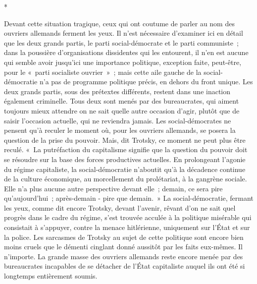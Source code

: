 \documentclass[french,twoside]{book} %
\begin{document}
\begin{center}
*\end{center}
\noindent Devant cette situation tragique, ceux qui ont coutume de parler au nom des ouvriers allemands ferment les yeux. Il n'est nécessaire d'examiner ici en détail que les deux grands partis, le parti social-démocrate et le parti commu­niste ; dans la poussière d'organisations dissidentes qui les entourent, il n'en est aucune qui semble avoir jusqu'ici une importance politique, exception faite, peut-être, pour le « parti socialiste ouvrier » ; mais cette aile gauche de la social-démocratie n'a pas de programme politique précis, en dehors du front unique. Les deux grands partis, sous des prétextes différents, restent dans une inaction également criminelle. Tous deux sont menés par des bureaucrates, qui aiment toujours mieux attendre on ne sait quelle autre occasion d'agir, plutôt que de saisir l'occasion actuelle, qui ne reviendra jamais. Les social-démo­crates ne pensent qu'à reculer le moment où, pour les ouvriers allemands, se posera la question de la prise du pouvoir. Mais, dit Trotsky, ce moment ne peut plus être reculé. « La putréfaction du capitalisme signifie que la question du pouvoir doit se résoudre sur la base des forces productives actuelles. En prolongeant l'agonie du régime capitaliste, la social-démocratie n'aboutit qu'à la décadence continue de la culture économique, au morcellement du prolé­tariat, à la gangrène sociale. Elle n'a plus aucune autre perspective devant elle ; demain, ce sera pire qu'aujourd'hui ; après-demain - pire que demain. » La social-démocratie, fermant les yeux, comme dit encore Trotsky, devant l'avenir, rêvant d'on ne sait quel progrès dans le cadre du régime, s'est trouvée acculée à la politique misérable qui consistait à s'appuyer, contre la menace hitlérienne, uniquement sur l'État et sur la police. Les sarcasmes de Trotsky au sujet de cette politique sont encore bien moins cruels que le démenti cinglant donné aussitôt par les faits eux-mêmes. Il n'importe. La grande masse des ouvriers allemands reste encore menée par des bureaucrates incapables de se détacher de l'État capitaliste auquel ils ont été si longtemps entièrement soumis.\par
\end{document}
